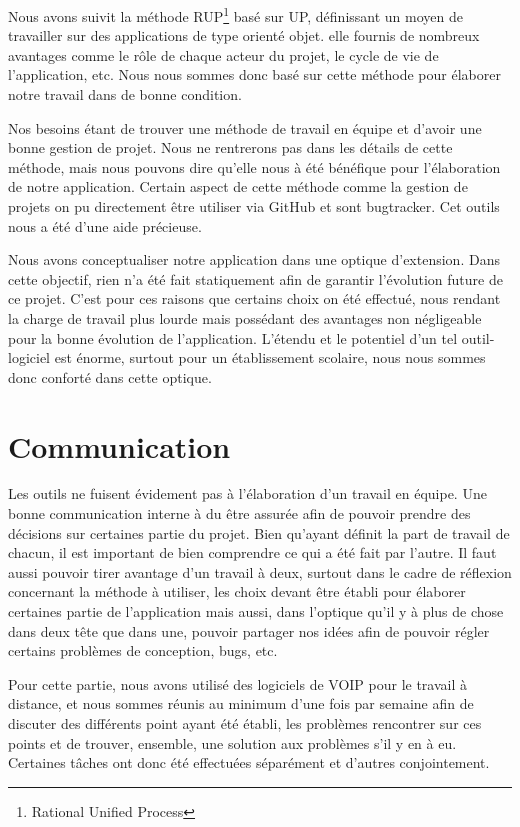 Nous avons suivit la méthode RUP\footnote{Rational Unified Process} basé sur UP, définissant un moyen de travailler sur des applications de type orienté objet. elle fournis de nombreux avantages comme le rôle de chaque acteur du projet, le cycle de vie de l'application, etc. Nous nous sommes donc basé sur cette méthode pour élaborer notre travail dans de bonne condition.

Nos besoins étant de trouver une méthode de travail en équipe et d'avoir une bonne gestion de projet. Nous ne rentrerons pas dans les détails de cette méthode, mais nous pouvons dire qu'elle nous à été bénéfique pour l'élaboration de notre application. Certain aspect de cette méthode comme la gestion de projets on pu directement être utiliser via GitHub et sont bugtracker. Cet outils nous a été d'une aide précieuse.

Nous avons conceptualiser notre application dans une optique d'extension. Dans cette objectif, rien n'a été fait statiquement afin de garantir l'évolution future de ce projet. C'est pour ces raisons que certains choix on été effectué, nous rendant la charge de travail plus lourde mais possédant des avantages non négligeable pour la bonne évolution de l'application. L'étendu et le potentiel d'un tel outil-logiciel est énorme, surtout pour un établissement scolaire, nous nous sommes donc conforté dans cette optique.

\section{Communication}
Les outils ne fuisent évidement pas à l'élaboration d'un travail en équipe. Une bonne communication interne à du être assurée afin de pouvoir prendre des décisions sur certaines partie du projet. Bien qu'ayant définit la part de travail de chacun, il est important de bien comprendre ce qui a été fait par l'autre. Il faut aussi pouvoir tirer avantage d'un travail à deux, surtout dans le cadre de réflexion concernant la méthode à utiliser, les choix devant être établi pour élaborer certaines partie de l'application mais aussi, dans l'optique qu'il y à plus de chose dans deux tête que dans une, pouvoir partager nos idées afin de pouvoir régler certains problèmes de conception, bugs, etc. 

Pour cette partie, nous avons utilisé des logiciels de VOIP pour le travail à distance, et nous sommes réunis au minimum d'une fois par semaine afin de discuter des différents point ayant été établi, les problèmes rencontrer sur ces points et de trouver, ensemble, une solution aux problèmes s'il y en à eu. Certaines tâches ont donc été effectuées séparément et d'autres conjointement.

